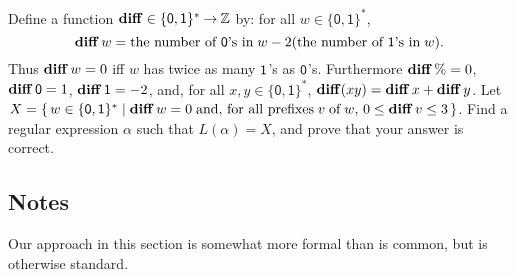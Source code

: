 \begin{exercise}
Define a function $\mathbf{diff}\in\{\mathsf{0,1}\}^*\mathbin{\to}\mathbb{Z}$ by:
for all $w\in\{\mathsf{0,1}\}^*$,
\begin{displaymath}
\mathbf{diff}\,w =
\allowbreak\mbox{the number of $\mathsf{0}$'s in}\allowbreak\;w -
2(\allowbreak\mbox{the number of $\mathsf{1}$'s in}\allowbreak\;w) .
\end{displaymath}
Thus $\mathbf{diff}\,w = 0$ iff $w$ has twice as many $\mathsf{1}$'s as
$\mathsf{0}$'s.  Furthermore $\mathbf{diff}\,\%=0$, $\mathbf{diff}\,\mathsf{0} = 1$,
$\mathbf{diff}\,\mathsf{1} = -2$, and, for all $x,y\in\{\mathsf{0,1}\}^*$,
$\mathbf{diff}(xy) = \mathbf{diff}\,x + \mathbf{diff}\,y$.  Let
$X=\{ \, w\in\{\mathsf{0,1}\}^* \mid \mathbf{diff}\,w=0\;\allowbreak\mbox{and, for all
    prefixes}\allowbreak\; v\;\allowbreak\mbox{of}\allowbreak\;w,\,0\leq\mathbf{diff}\,v\leq 3 \, \}$.  Find a regular
expression $\alpha$ such that $L(\alpha)=X$, and prove that your
answer is correct.
\end{exercise}

%
%

\subsection{Notes}

Our approach in this section is somewhat more formal than is common, but
is otherwise standard.

